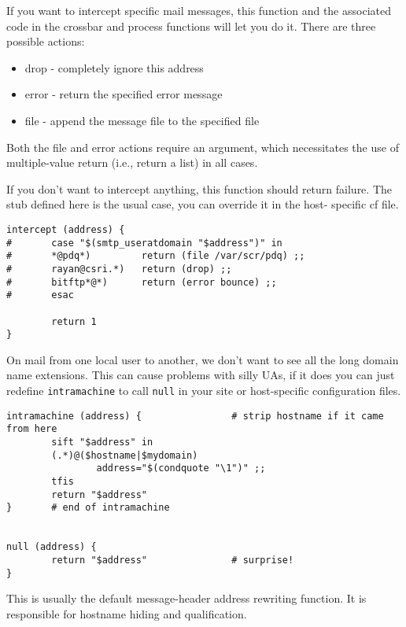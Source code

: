 If you want to intercept specific mail messages, this function and the
associated code in the crossbar and process functions will let you do it.  
There are three possible actions:

\begin{itemize}
\item drop      - completely ignore this address
\item error     - return the specified error message
\item file      - append the message file to the specified file
\end{itemize}


Both the file and error actions require an argument, which necessitates
the use of multiple-value return (i.e., return a list) in all cases.

If you don't want to intercept anything, this function should return failure.
The stub defined here is the usual case, you can override it in the host-
specific cf file.

\begin{verbatim}
intercept (address) {
#       case "$(smtp_useratdomain "$address")" in
#       *@pdq*)         return (file /var/scr/pdq) ;;
#       rayan@csri.*)   return (drop) ;;
#       bitftp*@*)      return (error bounce) ;;
#       esac

        return 1
}
\end{verbatim}


On mail from one local user to another, we don't want to see all the
long domain name extensions.  This can cause problems with silly UAs,
if it does you can just redefine {\tt intramachine} to call 
{\tt null} in your
site or host-specific configuration files.

\begin{verbatim}
intramachine (address) {                # strip hostname if it came from here
        sift "$address" in
        (.*)@($hostname|$mydomain)
                address="$(condquote "\1")" ;;
        tfis
        return "$address"
}       # end of intramachine


null (address) {
        return "$address"               # surprise!
}
\end{verbatim}


This is usually the default message-header address rewriting function.
It is responsible for hostname hiding and qualification.

